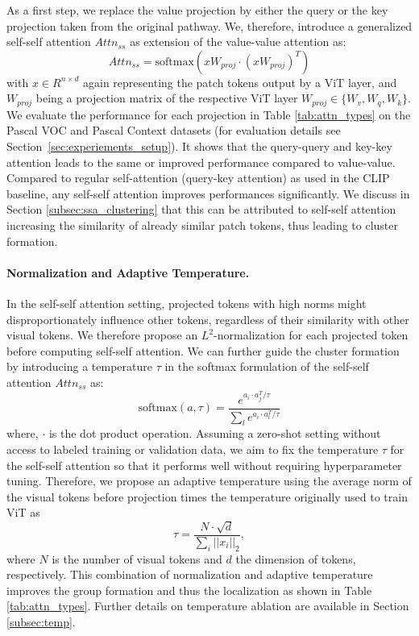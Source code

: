 \documentclass[10pt,twocolumn,letterpaper]{article}
\begin{document}
As a first step, we replace the value projection by either the query or the key projection taken from the original pathway. 
We, therefore, introduce a generalized self-self attention $Attn_{ss}$ as extension of the value-value attention as:
\begin{equation}
Attn_{ss} = \mathrm{softmax}(x W_{proj} \cdot (x W_{proj})^T) 
\end{equation}
with $x \in R^{n \times d}$ again representing the patch tokens output by a ViT layer, and $W_{proj}$ being a projection matrix of the respective ViT layer $W_{proj}\in\{W_v, W_q, W_k\}$.
We evaluate the performance for each projection in Table \ref{tab:attn_types} on the Pascal VOC and Pascal Context datasets (for evaluation details see Section~\ref{sec:experiements_setup}). It shows that the query-query and key-key attention leads to the same or improved performance compared to value-value. Compared to regular self-attention (query-key attention) as used in the CLIP baseline, any self-self attention improves performances significantly. We discuss in Section \ref{subsec:ssa_clustering} that this can be attributed to self-self attention increasing the similarity of already similar patch tokens, thus leading to cluster formation.


\paragraph{Normalization and Adaptive Temperature.}
In the self-self attention setting, projected tokens with high norms might disproportionately influence other tokens, regardless of their similarity with other visual tokens.
We therefore propose an $L^2$-normalization for each projected token before computing self-self attention.  
We can further guide the cluster formation by introducing a temperature $\tau$ in the softmax formulation of the self-self attention $Attn_{ss}$ as:
\begin{equation}\label{eq:self-self-attn-output}
    \mathrm{softmax}(a,\tau) = \frac{e^{a_i \cdot a_j^T/\tau}}{\sum_l e^{a_i \cdot a_l^T/\tau}}    
\end{equation}
where, $\cdot$ is the dot product operation.
Assuming a zero-shot setting without access to labeled training or validation data, we aim to fix the temperature $\tau$ for the self-self attention so that it performs well without requiring hyperparameter tuning.
Therefore, we propose an adaptive temperature using the average norm of the visual tokens before projection times the temperature originally used to train ViT as 
\begin{equation}
\tau = \frac{N \cdot \sqrt{d}}{\sum_i ||x_i||_2},
\end{equation}
where $N$ is the number of visual tokens and $d$ the dimension of tokens, respectively.
This combination of normalization and adaptive temperature improves the group formation and thus the localization as shown in Table \ref{tab:attn_types}. Further details on temperature ablation are available in Section \ref{subsec:temp}. 
\end{document}
